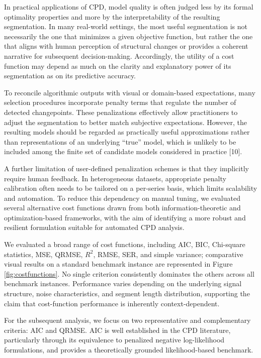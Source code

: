 \documentclass[preprints,article,submit,pdftex,moreauthors]{Definitions/mdpi}
\begin{document}
In practical applications of CPD, model quality is often judged less by its formal optimality properties and more by the interpretability of the resulting segmentation. In many real-world settings, the most useful segmentation is not necessarily the one that minimizes a given objective function, but rather the one that aligns with human perception of structural changes or provides a coherent narrative for subsequent decision-making. Accordingly, the utility of a cost function may depend as much on the clarity and explanatory power of its segmentation as on its predictive accuracy.

To reconcile algorithmic outputs with visual or domain-based expectations, many selection procedures incorporate penalty terms that regulate the number of detected changepoints. These penalizations effectively allow practitioners to adjust the segmentation to better match subjective expectations. However, the resulting models should be regarded as practically useful approximations rather than representations of an underlying “true” model, which is unlikely to be included among the finite set of candidate models considered in practice [10].

A further limitation of user-defined penalization schemes is that they implicitly require human feedback. In heterogeneous datasets, appropriate penalty calibration often needs to be tailored on a per-series basis, which limits scalability and automation. To reduce this dependency on manual tuning, we evaluated several alternative cost functions drawn from both information-theoretic and optimization-based frameworks, with the aim of identifying a more robust and resilient formulation suitable for automated CPD analysis.

We evaluated a broad range of cost functions, including AIC, BIC, Chi-square statistics, MSE, QRMSE, $R^2$, RMSE, SER, and simple variance; comparative visual results on a standard benchmark instance are represented in Figure \ref{fig:costfunctions}. No single criterion consistently dominates the others across all benchmark instances. Performance varies depending on the underlying signal structure, noise characteristics, and segment length distribution, supporting the claim that cost-function performance is inherently context-dependent.

For the subsequent analysis, we focus on two representative and complementary criteria: AIC and QRMSE. AIC is well established in the CPD literature, particularly through its equivalence to penalized negative log-likelihood formulations, and provides a theoretically grounded likelihood-based benchmark.
\end{document}
